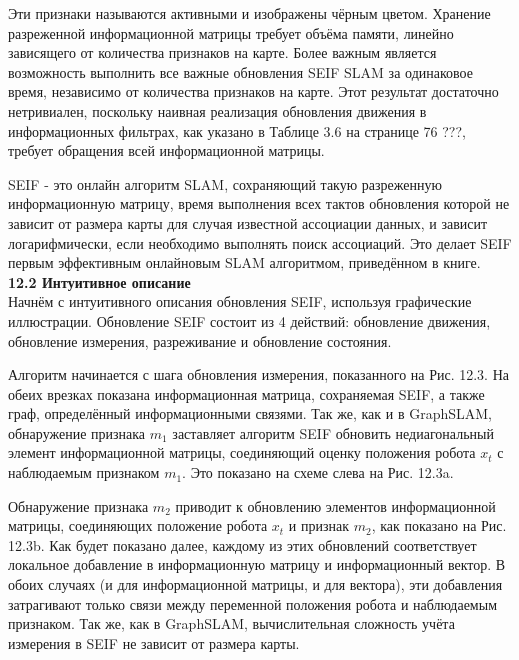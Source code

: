 \documentclass[10pt,a4paper]{article}
\begin{document}
Эти признаки называются активными и изображены чёрным цветом. Хранение разреженной информационной матрицы требует объёма памяти, линейно зависящего от количества признаков на карте. Более важным является возможность выполнить все важные обновления SEIF SLAM за одинаковое время, независимо от количества признаков на карте. Этот результат достаточно нетривиален, поскольку наивная реализация обновления движения в информационных фильтрах, как указано в Таблице 3.6 на странице 76  ???, требует обращения всей информационной матрицы.

SEIF  - это онлайн алгоритм SLAM, сохраняющий такую разреженную информационную матрицу, время выполнения всех тактов обновления которой не зависит от размера карты для случая известной ассоциации данных, и зависит логарифмически, если необходимо выполнять поиск ассоциаций. Это делает SEIF первым эффективным онлайновым SLAM алгоритмом, приведённом в книге.\\

\textbf{12.2	Интуитивное описание}\\

Начнём с интуитивного описания обновления SEIF, используя графические иллюстрации. Обновление SEIF состоит из 4 действий: обновление движения, обновление измерения, разреживание и обновление состояния.

Алгоритм начинается с шага обновления измерения, показанного на Рис. 12.3. На обеих врезках показана информационная матрица, сохраняемая SEIF, а также граф, определённый информационными связями. Так же, как и в GraphSLAM, обнаружение признака $m_1$ заставляет алгоритм SEIF обновить недиагональный элемент информационной матрицы, соединяющий оценку положения робота $x_t$ с наблюдаемым признаком $m_1$. Это показано на схеме слева на Рис. 12.3a.

Обнаружение признака $m_2$ приводит к обновлению элементов информационной матрицы, соединяющих положение робота $x_t$ и признак $m_2$, как показано на Рис. 12.3b. Как будет показано далее, каждому из этих обновлений соответствует локальное добавление в информационную матрицу и информационный вектор. В обоих случаях (и для информационной матрицы, и для вектора), эти добавления затрагивают только связи между переменной положения робота и наблюдаемым признаком. Так же, как в GraphSLAM, вычислительная сложность учёта измерения в SEIF не зависит от размера карты.
\end{document}
